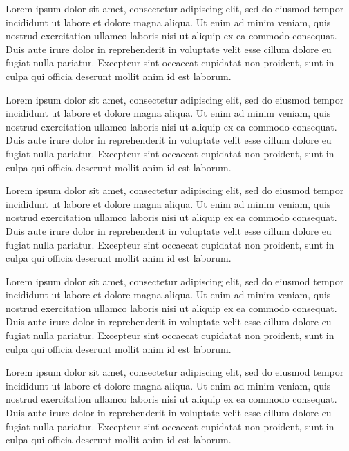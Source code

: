 \documentclass[12pt,a4paper]{article}
\begin{document}
Lorem ipsum dolor sit amet, consectetur adipiscing elit, sed do eiusmod
tempor incididunt ut labore et dolore magna aliqua. Ut enim ad minim
veniam, quis nostrud exercitation ullamco laboris nisi ut aliquip ex ea
commodo consequat. Duis aute irure dolor in reprehenderit in voluptate
velit esse cillum dolore eu fugiat nulla pariatur. Excepteur sint
occaecat cupidatat non proident, sunt in culpa qui officia deserunt
mollit anim id est laborum.

Lorem ipsum dolor sit amet, consectetur adipiscing elit, sed do eiusmod
tempor incididunt ut labore et dolore magna aliqua. Ut enim ad minim
veniam, quis nostrud exercitation ullamco laboris nisi ut aliquip ex ea
commodo consequat. Duis aute irure dolor in reprehenderit in voluptate
velit esse cillum dolore eu fugiat nulla pariatur. Excepteur sint
occaecat cupidatat non proident, sunt in culpa qui officia deserunt
mollit anim id est laborum.

Lorem ipsum dolor sit amet, consectetur adipiscing elit, sed do eiusmod
tempor incididunt ut labore et dolore magna aliqua. Ut enim ad minim
veniam, quis nostrud exercitation ullamco laboris nisi ut aliquip ex ea
commodo consequat. Duis aute irure dolor in reprehenderit in voluptate
velit esse cillum dolore eu fugiat nulla pariatur. Excepteur sint
occaecat cupidatat non proident, sunt in culpa qui officia deserunt
mollit anim id est laborum.

Lorem ipsum dolor sit amet, consectetur adipiscing elit, sed do eiusmod
tempor incididunt ut labore et dolore magna aliqua. Ut enim ad minim
veniam, quis nostrud exercitation ullamco laboris nisi ut aliquip ex ea
commodo consequat. Duis aute irure dolor in reprehenderit in voluptate
velit esse cillum dolore eu fugiat nulla pariatur. Excepteur sint
occaecat cupidatat non proident, sunt in culpa qui officia deserunt
mollit anim id est laborum.

Lorem ipsum dolor sit amet, consectetur adipiscing elit, sed do eiusmod
tempor incididunt ut labore et dolore magna aliqua. Ut enim ad minim
veniam, quis nostrud exercitation ullamco laboris nisi ut aliquip ex ea
commodo consequat. Duis aute irure dolor in reprehenderit in voluptate
velit esse cillum dolore eu fugiat nulla pariatur. Excepteur sint
occaecat cupidatat non proident, sunt in culpa qui officia deserunt
mollit anim id est laborum.


\newpage

\end{document}
